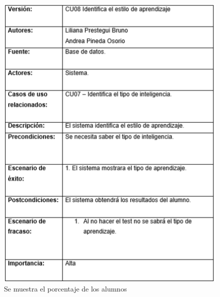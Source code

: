 \documentclass[letterpaper,oneside,openany,11pt]{book}
\begin{document}
\begin{figure}[H]
	\centering
	\includegraphics[width=1.0\textwidth]{./Imagenes/20}
	\caption{Se muestra el porcentaje de los alumnos}
\end{figure}
\end{document}

